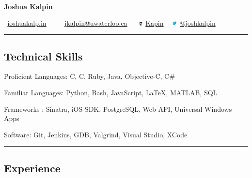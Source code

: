 \documentclass[10pt,letterpaper]{article}
\newenvironment{indentsection}[1]%
{\begin{list}{}%
	{\setlength{\leftmargin}{#1}}%
	\item[]%
}
{\end{list}}
\newcommand{\CPP}
{C\nolinebreak[4]\hspace{-.05em}\raisebox{.22ex}{\footnotesize\bf ++}}
\begin{document}
\begin{center}
{\LARGE \textbf{Joshua Kalpin}}
\vspace{0.1cm}

\Mundus \ \href{http://joshuakalp.in}{joshuakalp.in} \ \textbullet
\ \ \Letter \ \href{mailto:jkalpin@uwaterloo.ca}{jkalpin@uwaterloo.ca} \ \textbullet
\ \includegraphics[height=6pt]{Resources/Octocat} 
\href{https://github.com/kapin}{Kapin} \ \textbullet
 \includegraphics[height=10pt]{Resources/twitter}
\href{https://twitter.com/joshkalpin}{@joshkalpin}
\end{center}

\hrule
\vspace{-0.4em}
\subsection*{Technical Skills}

\begin{indentsection}{\parindent}
\begin{description*}
	\item[Proficient Languages:]
	C, \CPP, Ruby, Java, Objective-C, C\#
	\item[Familiar Languages:]
	Python, Bash, JavaScript, \LaTeX, MATLAB, SQL
	\item[Frameworks]:
	Sinatra, iOS SDK, PostgreSQL, Web API, Universal Windows Apps
	\item[Software:]
	Git, Jenkins, GDB, Valgrind, Visual Studio, XCode
\end{description*}
\end{indentsection}

\hrule
\vspace{-0.4em}
\subsection*{Experience}
\end{document}
